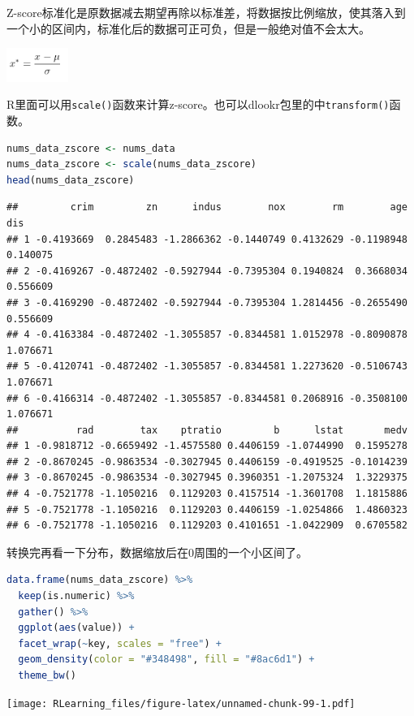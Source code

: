 \documentclass[]{ctexbook}
\newcommand{\passthrough}[1]{#1}
\begin{document}
Z-score标准化是原数据减去期望再除以标准差，将数据按比例缩放，使其落入到一个小的区间内，标准化后的数据可正可负，但是一般绝对值不会太大。

\includegraphics[width=0.15\textwidth,height=\textheight]{./image/task02_z-score.png}

R里面可以用\passthrough{\lstinline!scale()!}函数来计算z-score。也可以dlookr包里的中\passthrough{\lstinline!transform()!}函数。

\begin{lstlisting}[language=R]
nums_data_zscore <- nums_data
nums_data_zscore <- scale(nums_data_zscore)
head(nums_data_zscore)
\end{lstlisting}

\begin{lstlisting}
##         crim         zn      indus        nox        rm        age      dis
## 1 -0.4193669  0.2845483 -1.2866362 -0.1440749 0.4132629 -0.1198948 0.140075
## 2 -0.4169267 -0.4872402 -0.5927944 -0.7395304 0.1940824  0.3668034 0.556609
## 3 -0.4169290 -0.4872402 -0.5927944 -0.7395304 1.2814456 -0.2655490 0.556609
## 4 -0.4163384 -0.4872402 -1.3055857 -0.8344581 1.0152978 -0.8090878 1.076671
## 5 -0.4120741 -0.4872402 -1.3055857 -0.8344581 1.2273620 -0.5106743 1.076671
## 6 -0.4166314 -0.4872402 -1.3055857 -0.8344581 0.2068916 -0.3508100 1.076671
##          rad        tax    ptratio         b      lstat       medv
## 1 -0.9818712 -0.6659492 -1.4575580 0.4406159 -1.0744990  0.1595278
## 2 -0.8670245 -0.9863534 -0.3027945 0.4406159 -0.4919525 -0.1014239
## 3 -0.8670245 -0.9863534 -0.3027945 0.3960351 -1.2075324  1.3229375
## 4 -0.7521778 -1.1050216  0.1129203 0.4157514 -1.3601708  1.1815886
## 5 -0.7521778 -1.1050216  0.1129203 0.4406159 -1.0254866  1.4860323
## 6 -0.7521778 -1.1050216  0.1129203 0.4101651 -1.0422909  0.6705582
\end{lstlisting}

转换完再看一下分布，数据缩放后在0周围的一个小区间了。

\begin{lstlisting}[language=R]
data.frame(nums_data_zscore) %>%
  keep(is.numeric) %>%
  gather() %>%
  ggplot(aes(value)) +
  facet_wrap(~key, scales = "free") +
  geom_density(color = "#348498", fill = "#8ac6d1") +
  theme_bw()
\end{lstlisting}

\texttt{[image: RLearning\_files/figure-latex/unnamed-chunk-99-1.pdf]}
\end{document}
